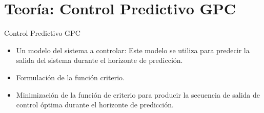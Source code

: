 \documentclass{beamer}
\begin{document}

\section{Teoría: Control Predictivo GPC}
\begin{frame}{Control Predictivo GPC}
\begin{justify}
\vspace{0.3cm}
\begin{itemize}
  Hay tres componentes principales en el diseño de un GPC:
    \item Un modelo del sistema a controlar: Este modelo se utiliza para predecir la salida del sistema durante el horizonte de predicción.
    \item Formulación de la función criterio.
    \item Minimización de la función de criterio para producir la secuencia de salida de control óptima durante el horizonte de predicción.
\end{itemize}
\end{justify}
\end{frame}
\end{document}

